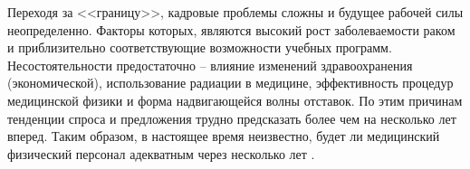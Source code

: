 \documentclass[a4paper,10pt]{extarticle}
\begin{document}
Переходя за <<границу>>, кадровые проблемы сложны и будущее рабочей силы неопределенно. Факторы которых, являются высокий рост заболеваемости раком и приблизительно соответствующие возможности учебных программ. Несостоятельности предостаточно -- влияние изменений здравоохранения (экономической), использование радиации в медицине, эффективность процедур медицинской физики и форма надвигающейся волны отставок. По этим причинам тенденции спроса и предложения трудно предсказать более чем на несколько лет вперед. Таким образом, в настоящее время неизвестно, будет ли медицинский физический персонал адекватным через несколько лет \cite{Newhauser}. 
 





%











\end{document}
